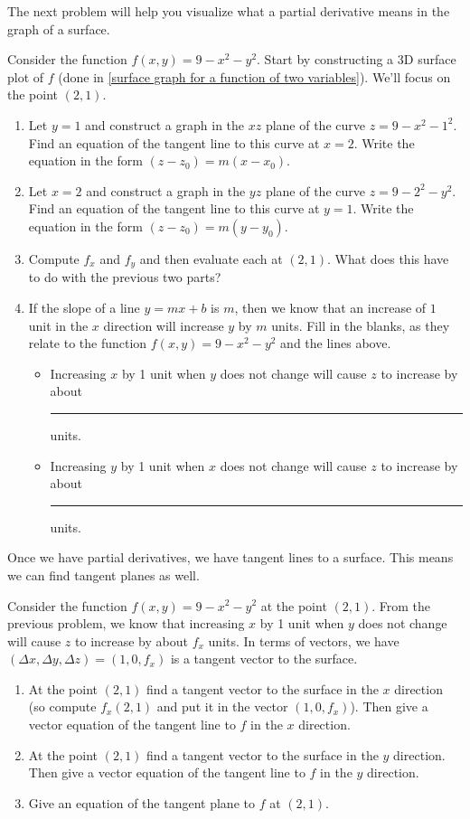 The next problem will help you visualize what a partial derivative means in the graph of a surface.
\begin{problem} \label{cake introduction}
 Consider the function $f(x,y)=9-x^2-y^2$.  Start by constructing a 3D surface plot of $f$ (done in \ref{surface graph for a function of two variables}). We'll focus on the point $(2,1)$.
\begin{enumerate}
 \item Let $y=1$ and construct a graph in the $xz$ plane of the curve $z=9-x^2-1^2$. Find an equation of the tangent line to this curve at $x=2$. Write the equation in the form $(z-z_0)=m(x-x_0)$.
 \item Let $x=2$ and construct a graph in the $yz$ plane of the curve $z=9-2^2-y^2$. Find an equation of the tangent line to this curve at $y=1$. Write the equation in the form $(z-z_0)=m(y-y_0)$.
 \item Compute $f_x$ and $f_y$ and then evaluate each at $(2,1)$.  What does this have to do with the previous two parts?
 \item If the slope of a line $y=mx+b$ is $m$, then we know that an increase of $1$ unit in the $x$ direction will increase $y$ by $m$ units. Fill in the blanks, as they relate to the function $f(x,y)=9-x^2-y^2$ and the lines above.
\begin{itemize}
 \item Increasing $x$ by 1 unit when $y$ does not change will cause $z$ to increase by about \rule{1cm}{1pt} units.
 \item Increasing $y$ by 1 unit when $x$ does not change will cause $z$ to increase by about \rule{1cm}{1pt} units.
\end{itemize}
\end{enumerate}
\end{problem}

Once we have partial derivatives, we have tangent lines to a surface. This means we can find tangent planes as well.
\begin{problem} \label{cake plane introduction}%
 Consider the function $f(x,y)=9-x^2-y^2$ at the point $(2,1)$. From the previous problem, we know that increasing $x$ by 1 unit when $y$ does not change will cause $z$ to increase by about $f_x$ units. In terms of vectors, we have $(\Delta x, \Delta y, \Delta z) = (1,0,f_x)$ is a tangent vector to the surface. 
\begin{enumerate}
 \item At the point $(2,1)$ find a tangent vector to the surface in the $x$ direction (so compute $f_x(2,1)$ and put it in the vector $(1,0,f_x)$). Then give a vector equation of the tangent line to $f$ in the $x$ direction.
 \item At the point $(2,1)$ find a tangent vector to the surface in the $y$ direction. 
Then give a vector equation of the tangent line to $f$ in the $y$ direction.
 \item Give an equation of the tangent plane to $f$ at $(2,1)$. 
\end{enumerate}
\end{problem}

